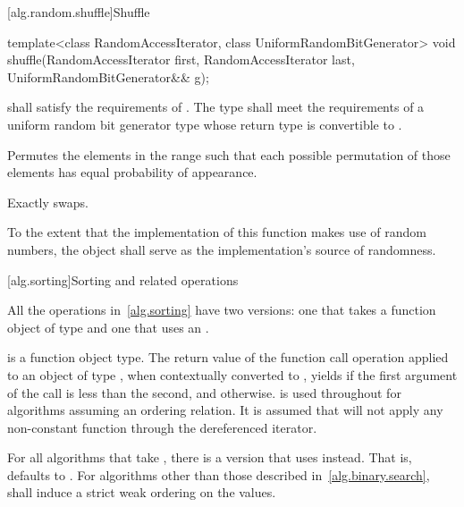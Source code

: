 [alg.random.shuffle]{Shuffle}

%
\begin{itemdecl}
template<class RandomAccessIterator, class UniformRandomBitGenerator>
  void shuffle(RandomAccessIterator first,
               RandomAccessIterator last,
               UniformRandomBitGenerator&& g);
\end{itemdecl}

\begin{itemdescr}
\pnum
\requires
{} shall satisfy the requirements of
.
The type
shall meet the requirements of a
uniform random bit generator type whose return type is
convertible to
.

\pnum
\effects
Permutes the elements in the range
such that each possible permutation of those elements has equal probability of appearance.

\pnum
\complexity
Exactly
swaps.

\pnum
\remarks
To the extent that the implementation of this function makes use of random
numbers, the object  shall serve as the implementation's source of
randomness.

\end{itemdescr}

[alg.sorting]{Sorting and related operations}

\pnum
All the operations in~\ref{alg.sorting} have two versions: one that takes a function object of type
and one that uses an
.

\pnum
{}
is a function object
type. The return value of the function call operation applied to
an object of type , when contextually converted to
,
yields  if the first argument of the call
is less than the second, and
otherwise.
is used throughout for algorithms assuming an ordering relation.
It is assumed that
will not apply any non-constant function through the dereferenced iterator.

\pnum
For all algorithms that take
,
there is a version that uses
instead.
That is,
defaults to
.
For algorithms other than those described in~\ref{alg.binary.search},
 shall induce a strict weak ordering on the values.


